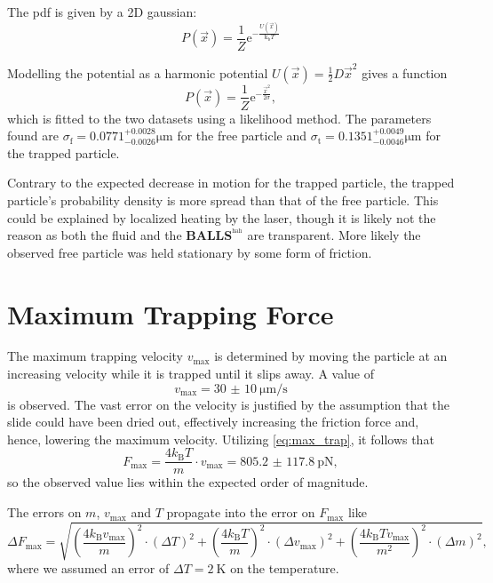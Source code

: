 The pdf is given by a 2D gaussian:
\begin{equation*}
	P(\vec{x}) = \frac{1}{Z} \text{e}^{-\frac{U(\vec{x})}{\text{k}_\text{b} T}}
\end{equation*}

Modelling the potential as a harmonic potential $U(\vec{x}) = \frac{1}{2} D \vec{x}^2$ gives a function
\begin{equation}
	P(\vec{x}) = \frac{1}{Z} \text{e}^{-\frac{\vec{x}^2}{2 \sigma}},
\end{equation}
which is fitted to the two datasets using a likelihood method.
The parameters found are $\sigma_\text{f} = \num{0.0771}^{+0.0028}_{-0.0026}\si{\um}$ for the free particle and $\sigma_\text{t} = \num{0.1351}^{+0.0049}_{-0.0046}\si{\um}$ for the trapped particle.

Contrary to the expected decrease in motion for the trapped particle, the trapped particle's probability density is more spread than that of the free particle.
This could be explained by localized heating by the laser, though it is likely not the reason as both the fluid and the \textbf{BALLS}$^{^\text{hah}}$  are transparent.
More likely the observed free particle was held stationary by some form of friction.

\section{Maximum Trapping Force}
The maximum trapping velocity $v_\text{max}$ is determined by moving the particle at an increasing velocity while it is trapped until it slips away.
A value of
\begin{equation*}
	v_\text{max} = \SI{30(10)}{\micro\meter\per\second}
\end{equation*}
is observed.
The vast error on the velocity is justified by the assumption that the slide could have been dried out, effectively increasing the friction force and, hence, lowering the maximum velocity.
Utilizing \autoref{eq:max_trap}, it follows that
\begin{equation*}
	F_\text{max} = \frac{4k_\text{B}T}{m}\cdot v_\text{max} = \SI{805.2(1178)}{\pico\newton},	%
\end{equation*}
so the observed value lies within the expected order of magnitude.

The errors on $m$, $v_\text{max}$ and $T$ propagate into the error on $F_\text{max}$ like
\begin{equation*}
	\Delta F_\text{max} = \sqrt{\left(\frac{4k_\text{B}v_\text{max}}{m}\right)^2\cdot\left(\Delta T\right)^2 + \left(\frac{4k_\text{B}T}{m}\right)^2\cdot\left(\Delta v_\text{max}\right)^2 + \left(\frac{4k_\text{B}Tv_\text{max}}{m^2}\right)^2\cdot\left(\Delta m\right)^2},
\end{equation*}
where we assumed an error of $\Delta T = \SI{2}{\kelvin}$ on the temperature.

